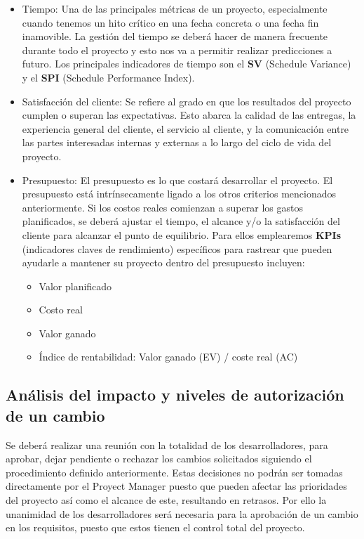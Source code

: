 \begin{itemize}

\item Tiempo: Una de las principales métricas de un proyecto, especialmente cuando tenemos un hito crítico en una fecha concreta o una fecha fin inamovible. La gestión del tiempo se deberá hacer de manera frecuente durante todo el proyecto y esto nos va a permitir realizar predicciones a futuro. Los principales indicadores de tiempo son el \textbf{SV} (Schedule Variance) y el \textbf{SPI} (Schedule Performance Index).

\item Satisfacción del cliente: Se refiere al grado en que los resultados del proyecto cumplen o superan las expectativas. Esto abarca la calidad de las entregas, la experiencia general del cliente, el servicio al cliente, y la comunicación entre las partes interesadas internas y externas a lo largo del ciclo de vida del proyecto.

\item Presupuesto: El presupuesto es lo que costará desarrollar el proyecto. El presupuesto está intrínsecamente ligado a los otros criterios mencionados anteriormente. Si los costos reales comienzan a superar los gastos planificados, se deberá ajustar el tiempo, el alcance y/o la satisfacción del cliente para alcanzar el punto de equilibrio.
Para ellos emplearemos \textbf{KPIs} (indicadores claves de rendimiento) específicos para rastrear que pueden ayudarle a mantener su proyecto dentro del presupuesto incluyen:

\begin{itemize}

\item Valor planificado
\item Costo real
\item Valor ganado
\item Índice de rentabilidad: Valor ganado (EV) / coste real (AC)

\end{itemize}

\end{itemize}

\subsection{Análisis del impacto y niveles de autorización de un cambio}

Se deberá realizar una reunión con la totalidad de los desarrolladores, para aprobar, dejar pendiente o rechazar los cambios solicitados siguiendo el procedimiento definido anteriormente. Estas decisiones no podrán ser tomadas directamente por el Proyect Manager puesto que pueden afectar las prioridades del proyecto así como el alcance de este, resultando en retrasos. Por ello la unanimidad de los desarrolladores será necesaria para la aprobación de un cambio en los requisitos, puesto que estos tienen el control total del proyecto.


